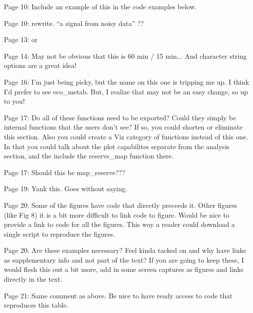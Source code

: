 \documentclass[letterpaper,12pt]{article}\usepackage[]{graphicx}\usepackage[]{color}
\begin{document}
Page 10: Include an example of this in the code examples below.

Page 10: rewrite. ``a signal from noisy data'' ??

Page 13: or

Page 14: May not be obvious that this is 60 min / 15 min... And character string options are a great idea!

Page 16: I'm just being picky, but the name on this one is tripping me up. I think I'd prefer to see eco\_metab. But, I realize that may not be an easy change, so up to you!

Page 17: Do all of these functions need to be exported? Could they simply be internal functions that the users don't see? If so, you could shorten or eliminate this section. Also you could create a Viz category of functions instead of this one. In that you could talk about the plot capabilites separate from the analysis section, and the include the reserve\_map function there.

Page 17: Should this be map\_reserve???

Page 19: Yank this. Goes without saying.

Page 20: Some of the figures have code that directly preceeds it. Other figures (like Fig 8) it is a bit more difficult to link code to figure. Would be nice to provide a link to code for all the figures. This way a reader could download a single script to reproduce the figures.

Page 20: Are these examples necessary? Feel kinda tacked on and why have links as supplementary info and not part of the text? If you are going to keep these, I would flesh this out a bit more, add in some screen captures as figures and links directly in the text.

Page 21: Same comment as above. Be nice to have ready access to code that reproduces this table.
\end{document}
